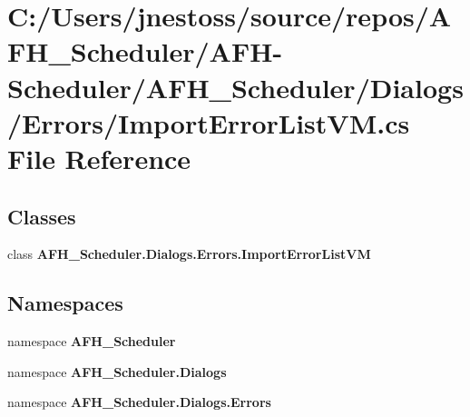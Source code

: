 \section{C\+:/\+Users/jnestoss/source/repos/\+A\+F\+H\+\_\+\+Scheduler/\+A\+F\+H-\/\+Scheduler/\+A\+F\+H\+\_\+\+Scheduler/\+Dialogs/\+Errors/\+Import\+Error\+List\+VM.cs File Reference}
\label{_import_error_list_v_m_8cs}
\subsection*{Classes}
\begin{DoxyCompactItemize}
\item 
class \textbf{ A\+F\+H\+\_\+\+Scheduler.\+Dialogs.\+Errors.\+Import\+Error\+List\+VM}
\end{DoxyCompactItemize}
\subsection*{Namespaces}
\begin{DoxyCompactItemize}
\item 
namespace \textbf{ A\+F\+H\+\_\+\+Scheduler}
\item 
namespace \textbf{ A\+F\+H\+\_\+\+Scheduler.\+Dialogs}
\item 
namespace \textbf{ A\+F\+H\+\_\+\+Scheduler.\+Dialogs.\+Errors}
\end{DoxyCompactItemize}
